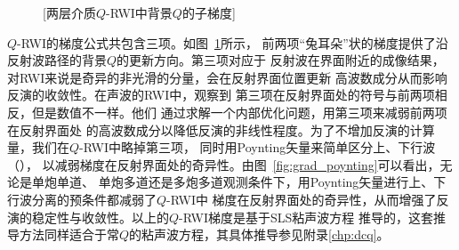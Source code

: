 \begin{figure}[!htbp]
    \centering
    [两层介质$Q$-RWI中背景$Q$的子梯度]
    \label{fig:grad_qrwi}
\end{figure}

$Q$-RWI的梯度公式共包含三项。如图~\ref{fig:grad_qrwi}所示，
前两项“兔耳朵”状的梯度提供了沿反射波路径的背景$Q$的更新方向。第三项对应于
反射波在界面附近的成像结果，对RWI来说是奇异的非光滑的分量，会在反射界面位置更新
高波数成分从而影响反演的收敛性。在声波的RWI中，观察到
第三项在反射界面处的符号与前两项相反，但是数值不一样。他们
通过求解一个内部优化问题，用第三项来减弱前两项在反射界面处
的高波数成分以降低反演的非线性程度。为了不增加反演的计算量，我们在$Q$-RWI中略掉第三项，
同时用Poynting矢量来简单区分上、下行波（），
以减弱梯度在反射界面处的奇异性。由图~\ref{fig:grad_poynting}可以看出，无论是单炮单道、
单炮多道还是多炮多道观测条件下，用Poynting矢量进行上、下行波分离的预条件都减弱了$Q$-RWI中
梯度在反射界面处的奇异性，从而增强了反演的稳定性与收敛性。以上的$Q$-RWI梯度是基于SLS粘声波方程
推导的，这套推导方法同样适合于常$Q$的粘声波方程，其具体推导参见附录\ref{chp:dcq}。


